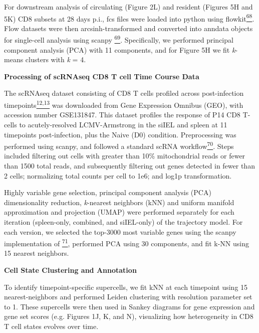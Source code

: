 For downstream analysis of circulating (Figure 2L) and resident (Figures
5H and 5K) CD8 subsets at 28 days p.i., fcs files were loaded into
python using
flowkit\href{https://sciwheel.com/work/citation?ids=13326827\&pre=\&suf=\&sa=0\&dbf=0}{\textsuperscript{68}}.
Flow datasets were then arcsinh-transformed and converted into anndata
objects for single-cell analysis using scanpy
\href{https://sciwheel.com/work/citation?ids=4822624\&pre=\&suf=\&sa=0\&dbf=0}{\textsuperscript{69}}.
Specifically, we performed principal component analysis (PCA) with 11
components, and for Figure 5H we fit \emph{k}-means clusters with
\emph{k} = 4.

\textbf{Processing of scRNAseq CD8 T cell Time Course Data }

The scRNAseq dataset consisting of CD8 T cells profiled across
post-infection
timepoints\href{https://sciwheel.com/work/citation?ids=8917053,8940021\&pre=\&pre=\&suf=\&suf=\&sa=0,0\&dbf=0\&dbf=0}{\textsuperscript{12,13}}
was downloaded from Gene Expression Omnibus (GEO), with accession number
GSE131847. This dataset profiles the response of P14 CD8 T-cells to
acutely-resolved LCMV-Armstrong in the siIEL and spleen at 11 timepoints
post-infection, plus the Naive (D0) condition. Preprocessing was
performed using scanpy, and followed a standard scRNA
workflow\href{https://sciwheel.com/work/citation?ids=7092677\&pre=\&suf=\&sa=0\&dbf=0}{\textsuperscript{70}}.
Steps included filtering out cells with greater than 10\% mitochondrial
reads or fewer than 1500 total reads, and subsequently filtering out
genes detected in fewer than 2 cells; normalizing total counts per cell
to 1e6; and log1p transformation.

Highly variable gene selection, principal component analysis (PCA)
dimensionality reduction, \emph{k}-nearest neighbors (kNN) and uniform
manifold approximation and projection (UMAP) were performed separately
for each iteration (spleen-only, combined, and siIEL-only) of the
trajectory model. For each version, we selected the top-3000 most
variable genes using the scanpy implementation of
\href{https://sciwheel.com/work/citation?ids=112055\&pre=\&suf=\&sa=0\&dbf=0}{\textsuperscript{71}},
performed PCA using 30 components, and fit k-NN using 15 nearest
neighbors.

\textbf{Cell State Clustering and Annotation}

To identify timepoint-specific supercells, we fit kNN at each timepoint
using 15 nearest-neighbors and performed Leiden clustering with
resolution parameter set to 1. These supercells were then used in Sankey
diagrams for gene expression and gene set scores (e.g. Figures 1J, K,
and N), visualizing how heterogeneity in CD8 T cell states evolves over
time.


